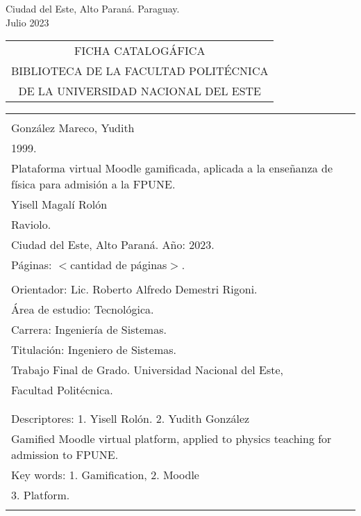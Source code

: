 \begin{center}
{\large Ciudad del Este, Alto Paraná. Paraguay.\\[6mm]
Julio 2023}
\end{center}
\newpage \normalsize
\thispagestyle{empty}
\begin{center} 
\begin{tabular}{c} 
  FICHA CATALOGÁFICA \\
  BIBLIOTECA DE LA FACULTAD POLITÉCNICA \\
  DE LA UNIVERSIDAD NACIONAL DEL ESTE \\
\end{tabular} %
\vspace{0.3cm}
\begin{tabular}{|l|} \hline %
  \\
  González Mareco, Yudith\\
   1999.\\
   Plataforma virtual Moodle gamificada, aplicada a la enseñanza de física para admisión a la FPUNE. \\
  Yisell Magalí Rolón \\
  Raviolo.\\
  Ciudad del Este, Alto Paraná. Año: 2023.\\
  Páginas: $<$cantidad de páginas$>$.\\ 
  \\
  Orientador: Lic. Roberto Alfredo Demestri Rigoni. \\
  
  Área de estudio: Tecnológica. \\
  Carrera: Ingeniería de Sistemas. \\
  Titulación: Ingeniero de Sistemas. \\
  
  Trabajo Final de Grado. Universidad Nacional del Este, \\
  Facultad Politécnica.\\
  \\ \\
  
  Descriptores: 1. Yisell Rolón. 2. Yudith González\\
  Gamified Moodle virtual platform, applied to physics teaching for admission to FPUNE. \\
  Key words: 1. Gamification, 2. Moodle \\
  \hspace{2cm} 3. Platform.\\
  \\
  \hline

\end{tabular}
\end{center}

